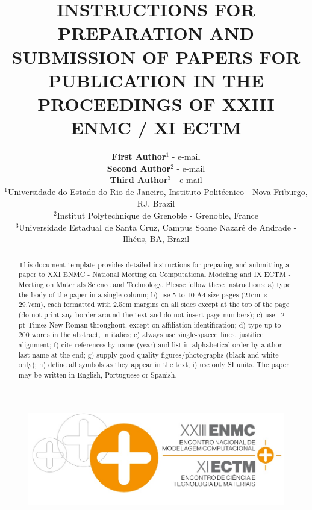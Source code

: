 \documentclass[12pt,fleqn]{article}
\title{INSTRUCTIONS FOR PREPARATION AND SUBMISSION OF PAPERS FOR PUBLICATION IN THE PROCEEDINGS OF XXIII ENMC / XI ECTM}
\author
    {\rm \begin{tabular}{l} 
    \textbf{First Author}$^{1}$ - {\textnormal e-mail}\\%
    \textbf{Second Author}$^{2}$ - {\textnormal e-mail}\\
    \textbf{Third Author}$^{3}$ - {\textnormal e-mail}\\
    {\fontsize{11}{0}\selectfont $^{1}$Universidade do Estado do Rio de Janeiro, Instituto Politécnico - Nova Friburgo, RJ, Brazil}\vspace*{-0.05cm} \\
    {\fontsize{11}{0}\selectfont $^{2}$Institut Polytechnique de Grenoble - Grenoble, France}\vspace*{-0.05cm}\\
    {\fontsize{11}{0}\selectfont $^{3}$Universidade Estadual de Santa Cruz, Campus Soane Nazaré de Andrade - Ilhéus, BA, Brazil}
  \end{tabular}}
\begin{document}
\begin{figure}   %
\centering

\begin{minipage}[c]{\textwidth}
\centering
    \includegraphics[width=5.75in]{logo.jpg}
\end{minipage}
\end{figure}

\vspace{-3cm}

\maketitle


\pagestyle{empty}

\thispagestyle{firspagetstyle}

\begin{abstract}
This document-template provides detailed instructions for preparing and submitting a paper to XXI ENMC - National Meeting on Computational Modeling and IX ECTM -Meeting on Materials Science and Technology. Please follow these instructions: a) type the body of the paper in a single column; b) use 5 to 10 A4-size pages (21cm $\times$ 29.7cm), each formatted with 2.5cm margins on all sides except at the top of the page (do not print any border around the text and do not insert page numbers); c) use 12 pt Times New Roman throughout, except on affiliation identification; d) type up to 200 words in the abstract, in italics; e) always use single-spaced lines, justified alignment; f) cite references by name (year) and list in alphabetical order by author last name at the end; g) supply good quality figures/photographs (black and white only); h) define all symbols as they appear in the text; i) use only SI units. The paper may be written in English, Portuguese or Spanish.
\end{abstract}

\end{document}

